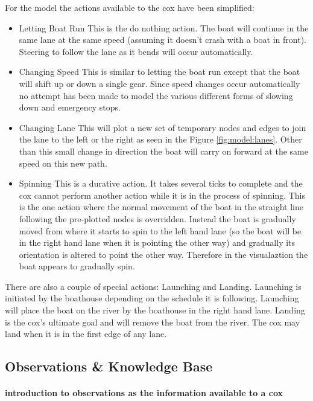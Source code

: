       For the model the actions available to the cox have been simplified:
      \begin{itemize}
        \item{Letting Boat Run} This is the do nothing action. The boat will continue in the same lane at the same speed (assuming it doesn't crash with a boat in front). Steering to follow the lane as it bends will occur automatically.
        \item{Changing Speed} This is similar to letting the boat run except that the boat will shift up or down a single gear. Since speed changes occur automatically no attempt has been made to model the various different forms of slowing down and emergency stops.
        \item{Changing Lane} This will plot a new set of temporary nodes and edges to join the lane to the left or the right as seen in the Figure \ref{fig:model:lanes}. Other than this small change in direction the boat will carry on forward at the same speed on this new path.
        \item{Spinning} This is a durative action. It takes several ticks to complete and the cox cannot perform another action while it is in the process of spinning. This is the one action where the normal movement of the boat in the straight line following the pre-plotted nodes  is overridden. Instead the boat is gradually moved from where it starts to spin to the left hand lane (so the boat will be in the right hand lane when it is pointing the other way) and gradually its orientation is altered to point the other way. Therefore in the visualaztion the boat appears to gradually spin.
      \end{itemize}
      
      There are also a couple of special actions: Launching and Landing. Launching is initiated by the boathouse depending on the schedule it is following. Launching will place the boat on the river by the boathouse in the right hand lane. Landing is the cox's ultimate goal and will remove the boat from the river. The cox may land when it is in the first edge of any lane.
      
      \subsection{Observations \& Knowledge Base} \label{model:cox:obs}
      \paragraph{introduction to observations as the information available to a cox}
      
